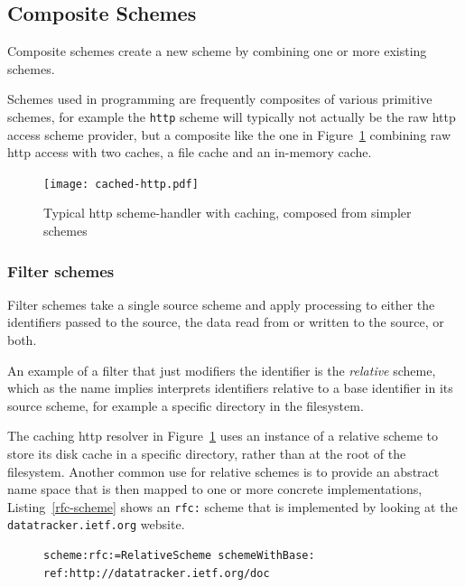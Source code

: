 \documentclass[preprint]{sigplanconf}
\begin{document}
\subsection{Composite Schemes}
\label{compositeSchemes}
Composite schemes  create a new scheme by combining one or 
more existing schemes. 

 Schemes used in programming 
are frequently composites of various primitive schemes, for example
the {\tt http} scheme will typically not actually be the raw http access
scheme provider, but a composite like the one in Figure~\ref{fig:http-cached} combining
raw http access with two caches, a file cache and an in-memory cache.


\begin{figure}[htbp]
\centering
\texttt{[image: cached-http.pdf]}
\caption{Typical http scheme-handler with caching, composed from simpler schemes}
\label{fig:http-cached}

\end{figure}


\subsubsection{Filter schemes}
\label{filterschemes}
Filter schemes take a single source scheme and apply processing to either
the identifiers passed to the source,  the data read from or written to the source, or both.

An example of a filter that just modifiers the identifier is the \emph{relative}
scheme, which as the name implies interprets identifiers relative to a base
identifier in its source scheme, for example a specific directory in the
filesystem.  

The caching http resolver in Figure~\ref{fig:http-cached} uses an instance
of a relative scheme to store its disk cache in a specific directory, rather
than at the root of the filesystem.  Another common use for relative schemes
is to provide an abstract name space that is then mapped to one
or more  concrete implementations, Listing~\ref{rfc-scheme} shows
an {\tt rfc:} scheme that is implemented by looking at the {\tt datatracker.ietf.org}
website.


\begin{figure}[htbp]
\begin{lstlisting}[style=numbers,label=rfc-scheme,caption=Defining a custom rfc: scheme.]
scheme:rfc:=RelativeScheme schemeWithBase: ref:http://datatracker.ietf.org/doc
\end{lstlisting}
\end{figure}
\end{document}
